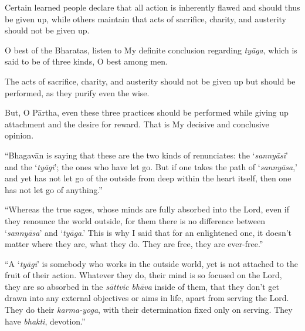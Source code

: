{Certain learned people declare that all action is inherently flawed and should thus be given up, while others maintain that acts of sacrifice, charity, and austerity should not be given up.}

{O best of the Bharatas, listen to My definite conclusion regarding \textit{tyāga}, which is said to be of three kinds, O best among men.}

{The acts of sacrifice, charity, and austerity should not be given up but should be performed, as they purify even the wise.}

{But, O Pārtha, even these three practices should be performed while giving up attachment and the desire for reward. That is My decisive and conclusive opinion.}

\enquote{Bhagavān is saying that these are the two kinds of renunciates: the \enquote{\textit{sannyāsī}} and the \enquote{\textit{tyāgī}}; the ones who have let go. But if one takes the path of \enquote{\textit{sannyāsa},} and yet has not let go of the outside from deep within the heart itself, then one has not let go of anything.}

\enquote{Whereas the true sages, whose minds are fully absorbed into the Lord, even if they renounce the world outside, for them there is no difference between \enquote{\textit{sannyāsa}} and \enquote{\textit{tyāga}.} This is why I said that for an enlightened one, it doesn’t matter where they are, what they do. They are free, they are ever-free.}

\enquote{A \enquote{\textit{tyāgī}} is somebody who works in the outside world, yet is not attached to the fruit of their action. Whatever they do, their mind is so focused on the Lord, they are so absorbed in the \textit{sāttvic bhāva} inside of them, that they don’t get drawn into any external objectives or aims in life, apart from serving the Lord. They do their \textit{karma-yoga}, with their determination fixed only on serving. They have \textit{bhakti}, devotion.}

